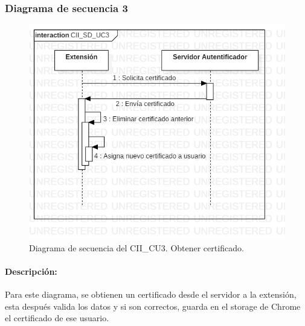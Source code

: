 \documentclass[12pt, a4paper, titlepage]{report}
\begin{document}
    		    \subsubsection{Diagrama de secuencia 3}
            	\begin{figure}[H]
    			    \begin{center} \includegraphics[width=12cm]{./imagenes/Disenio/Componente_2/CII_SD_UC3.png}
    			    \caption[Diagrama de secuencia 3 del Componente II]{Diagrama de secuencia del CII\_CU3. Obtener certificado.}
    		        \end{center}
    		    \end{figure}
    		    
    		    \paragraph{Descripción:} Para este diagrama, se obtienen un certificado desde el servidor a la extensión, esta después valida los datos y si son correctos, guarda en el storage de Chrome el certificado de ese usuario.
    		    
\end{document}
